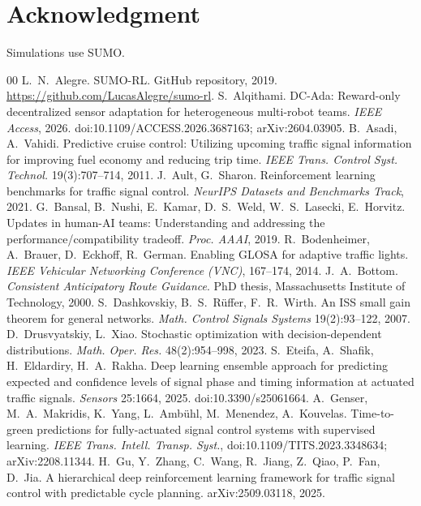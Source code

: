 \section*{Acknowledgment}
Simulations use SUMO.

\begin{thebibliography}{00}\footnotesize
{} L.~N.~Alegre. SUMO-RL. GitHub repository, 2019. \url{https://github.com/LucasAlegre/sumo-rl}.
 S.~Alqithami. DC-Ada: Reward-only decentralized sensor adaptation for heterogeneous multi-robot teams. \emph{IEEE Access}, 2026. doi:10.1109/ACCESS.2026.3687163; arXiv:2604.03905.
 B.~Asadi, A.~Vahidi. Predictive cruise control: Utilizing upcoming traffic signal information for improving fuel economy and reducing trip time. \emph{IEEE Trans. Control Syst. Technol.} 19(3):707--714, 2011.
 J.~Ault, G.~Sharon. Reinforcement learning benchmarks for traffic signal control. \emph{NeurIPS Datasets and Benchmarks Track}, 2021.
 G.~Bansal, B.~Nushi, E.~Kamar, D.~S.~Weld, W.~S.~Lasecki, E.~Horvitz. Updates in human-AI teams: Understanding and addressing the performance/compatibility tradeoff. \emph{Proc. AAAI}, 2019.
 R.~Bodenheimer, A.~Brauer, D.~Eckhoff, R.~German. Enabling GLOSA for adaptive traffic lights. \emph{IEEE Vehicular Networking Conference (VNC)}, 167--174, 2014.
 J.~A.~Bottom. \emph{Consistent Anticipatory Route Guidance}. PhD thesis, Massachusetts Institute of Technology, 2000.
 S.~Dashkovskiy, B.~S.~R\"uffer, F.~R.~Wirth. An ISS small gain theorem for general networks. \emph{Math. Control Signals Systems} 19(2):93--122, 2007.
 D.~Drusvyatskiy, L.~Xiao. Stochastic optimization with decision-dependent distributions. \emph{Math. Oper. Res.} 48(2):954--998, 2023.
 S.~Eteifa, A.~Shafik, H.~Eldardiry, H.~A.~Rakha. Deep learning ensemble approach for predicting expected and confidence levels of signal phase and timing information at actuated traffic signals. \emph{Sensors} 25:1664, 2025. doi:10.3390/s25061664.
 A.~Genser, M.~A.~Makridis, K.~Yang, L.~Amb\"uhl, M.~Menendez, A.~Kouvelas. Time-to-green predictions for fully-actuated signal control systems with supervised learning. \emph{IEEE Trans. Intell. Transp. Syst.}, doi:10.1109/TITS.2023.3348634; arXiv:2208.11344.
 H.~Gu, Y.~Zhang, C.~Wang, R.~Jiang, Z.~Qiao, P.~Fan, D.~Jia. A hierarchical deep reinforcement learning framework for traffic signal control with predictable cycle planning. arXiv:2509.03118, 2025.

\end{thebibliography}
